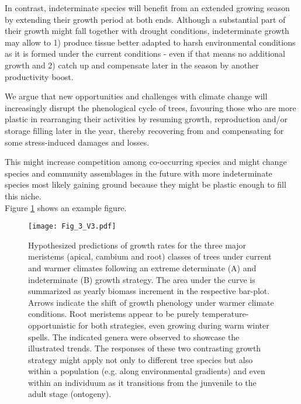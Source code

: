 \documentclass{article}
\begin{document}
In contrast, indeterminate species will benefit from an extended growing season by extending their growth period at both ends. Although a substantial part of their growth might fall together with drought conditions, indeterminate growth may allow to 1) produce tissue better adapted to harsh environmental conditions as it is formed under the current conditions - even if that means no additional growth and 2) catch up and compensate later in the season by another productivity boost. 

We argue that new opportunities and challenges with climate change will increasingly disrupt the phenological cycle of trees, favouring those who are more plastic in rearranging their activities by resuming growth, reproduction and/or storage filling later in the year, thereby recovering from and compensating for some stress-induced damages and losses.

This might increase competition among co-occurring species and might change species and community assemblages in the future with more indeterminate species most likely gaining ground because they might be plastic enough to fill this niche. \\ %



			Figure \ref{fig:fig_3xxx} shows an example figure.
	
								\begin{figure}
								\centering
								\texttt{[image: Fig\_3\_V3.pdf]} 
								\caption{Hypothesized predictions of growth rates for the three major meristems (apical, cambium and root) classes of trees under current and warmer climates following an extreme determinate (A) and indeterminate (B) growth strategy. The area under the curve is summarized as yearly biomass increment in the respective bar-plot. Arrows indicate the shift of growth phenology under warmer climate conditions. Root meristems appear to be purely temperature-opportunistic for both strategies, even growing during warm winter spells. The indicated genera were observed to showcase the illustrated trends. The responses of these two contrasting growth strategy might apply not only to different tree species but also within a population (e.g. along environmental gradients) and even within an individuum as it transitions from the junvenile to the adult stage (ontogeny).}
								\label{fig:fig_3xxx}
							\end{figure}
	
\end{document}
